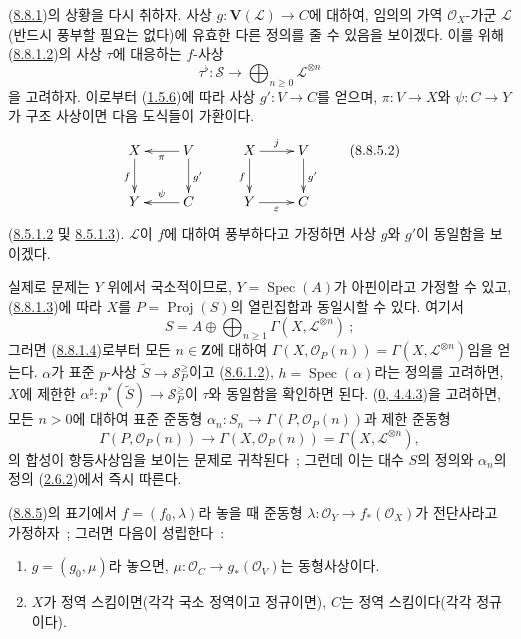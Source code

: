 \begin{env}[8.8.5]
\label{II.8.8.5-ko}
(\hyperref[II.8.8.1-ko]{8.8.1})의 상황을 다시 취하자. 사상
$g:\mathbf{V}(\mathcal{L})\to C$에 대하여, 임의의 가역
$\mathcal{O}_X$-가군 $\mathcal{L}$ (반드시 풍부할 필요는 없다)에
유효한 다른 정의를 줄 수 있음을 보이겠다. 이를 위해
(\hyperref[II.8.8.1.2-ko]{8.8.1.2})의 사상 $\tau$에 대응하는
$f$-사상
\begin{equation}
\label{II.8.8.5.1-ko}
  \tau^\flat:\mathcal{S}\longrightarrow
  \bigoplus_{n\geqslant 0}\mathcal{L}^{\otimes n}
\tag{8.8.5.1}
\end{equation}
을 고려하자. 이로부터 (\hyperref[II.1.5.6-ko]{1.5.6})에 따라 사상
$g':V\to C$를 얻으며, $\pi:V\to X$와 $\psi:C\to Y$가 구조 사상이면
다음 도식들이 가환이다.
\begin{equation}
\label{II.8.8.5.2-ko}
  \xymatrix{
    X\ar[d]_{f} & V\ar[l]^{\pi}\ar[d]^{g'}\\
    Y & C\ar[l]_{\psi}
  }
  \qquad
  \xymatrix{
    X\ar[r]^{j}\ar[d]_{f} & V\ar[d]^{g'}\\
    Y\ar[r]_{\varepsilon} & C
  }
\tag{8.8.5.2}
\end{equation}
(\hyperref[II.8.5.1.2-ko]{8.5.1.2} 및
\hyperref[II.8.5.1.3-ko]{8.5.1.3}). $\mathcal{L}$이 $f$에 대하여
풍부하다고 가정하면 사상 $g$와 $g'$이 동일함을 보이겠다.

실제로 문제는 $Y$ 위에서 국소적이므로,
$Y=\operatorname{Spec}(A)$가 아핀이라고 가정할 수 있고,
(\hyperref[II.8.8.1.3-ko]{8.8.1.3})에 따라 $X$를
$P=\operatorname{Proj}(S)$의 열린집합과 동일시할 수 있다. 여기서
\[
  S=A\oplus\bigoplus_{n\geqslant 1}
  \Gamma(X,\mathcal{L}^{\otimes n})~;
\]
그러면 (\hyperref[II.8.8.1.4-ko]{8.8.1.4})로부터 모든
$n\in\mathbf{Z}$에 대하여
$\Gamma(X,\mathcal{O}_P(n))=\Gamma(X,\mathcal{L}^{\otimes n})$임을 얻는다.
$\alpha$가 표준 $p$-사상
$\widetilde{S}\to\mathcal{S}_P^{\geqslant}$이고
(\hyperref[II.8.6.1.2-ko]{8.6.1.2}),
$h=\operatorname{Spec}(\alpha)$라는 정의를 고려하면, $X$에 제한한
$\alpha^\sharp:p^*(\widetilde{S})\to\mathcal{S}_P^{\geqslant}$이
$\tau$와 동일함을 확인하면 된다. (\hyperref[0.4.4.3-ko]{0, 4.4.3})을
고려하면, 모든 $n>0$에 대하여 표준 준동형
$\alpha_n:S_n\to\Gamma(P,\mathcal{O}_P(n))$과 제한 준동형
\[
  \Gamma(P,\mathcal{O}_P(n))\longrightarrow
  \Gamma(X,\mathcal{O}_P(n))=
  \Gamma(X,\mathcal{L}^{\otimes n}),
\]
의 합성이 항등사상임을 보이는 문제로 귀착된다~; 그런데 이는 대수
$S$의 정의와 $\alpha_n$의 정의
(\hyperref[II.2.6.2-ko]{2.6.2})에서 즉시 따른다.
\end{env}

\begin{proposition}[8.8.6]
\label{II.8.8.6-ko}
(\hyperref[II.8.8.5-ko]{8.8.5})의 표기에서 $f=(f_0,\lambda)$라 놓을 때
준동형 $\lambda:\mathcal{O}_Y\to f_*(\mathcal{O}_X)$가 전단사라고
가정하자~; 그러면 다음이 성립한다~:
\begin{enumerate}
  \item[\rm{(i)}] $g=(g_0,\mu)$라 놓으면,
  $\mu:\mathcal{O}_C\to g_*(\mathcal{O}_V)$는 동형사상이다.
  \item[\rm{(ii)}] $X$가 정역 스킴이면(각각 국소 정역이고 정규이면),
  $C$는 정역 스킴이다(각각 정규이다).
\end{enumerate}
\end{proposition}

